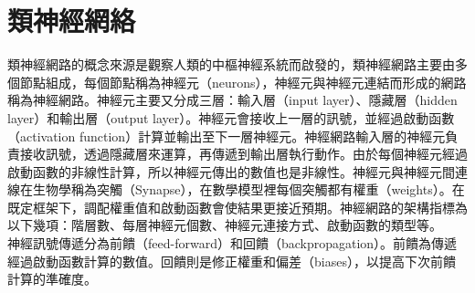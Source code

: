 \documentclass[14pt,a4paper]{report}  %
\begin{document}
\section{類神經網絡}
\qquad 類神經網路的概念來源是觀察人類的中樞神經系統而啟發的，類神經網路主要由多個節點組成，每個節點稱為神經元（neurons），神經元與神經元連結而形成的網路稱為神經網路。神經元主要又分成三層：輸入層（input layer）、隱藏層（hidden layer）和輸出層（output layer）。神經元會接收上一層的訊號，並經過啟動函數（activation function）計算並輸出至下一層神經元。神經網路輸入層的神經元負責接收訊號，透過隱藏層來運算，再傳遞到輸出層執行動作。由於每個神經元經過啟動函數的非線性計算，所以神經元傳出的數值也是非線性。神經元與神經元間連線在生物學稱為突觸（Synapse），在數學模型裡每個突觸都有權重（weights）。在既定框架下，調配權重值和啟動函數會使結果更接近預期。神經網路的架構指標為以下幾項：階層數、每層神經元個數、神經元連接方式、啟動函數的類型等。\\[12pt]

\qquad 神經訊號傳遞分為前饋（feed-forward）和回饋（backpropagation）。前饋為傳遞經過啟動函數計算的數值。回饋則是修正權重和偏差（biases），以提高下次前饋計算的準確度。
\end{document}
